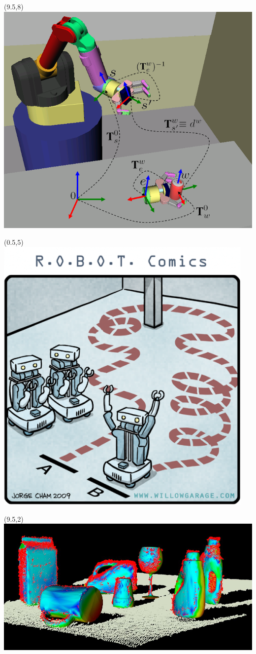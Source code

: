 \documentclass{beamer}
\begin{document}
\begin{frame}[plain]{}
\begin{textblock}{5}
         \end{textblock} 
         \begin{textblock}{5}(9.5,8)
             \includegraphics[width=1.2\linewidth]{figures/pick_and_place.png}
         \end{textblock}           
         \begin{textblock}{5}(0.5,5)
             \includegraphics[width=0.6\linewidth]{figures/nav_comic.png}
         \end{textblock}                      
         \begin{textblock}{5}(9.5,2)
             \includegraphics[width=1.0\linewidth]{figures/object_recognition.jpg}

\end{textblock}
\end{frame}
\end{document}
